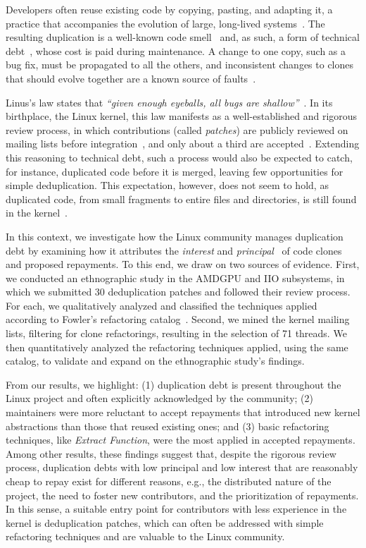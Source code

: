 \documentclass[10pt,conference]{IEEEtran}
\begin{document}
Developers often reuse existing code by copying, pasting, and adapting it, a practice that accompanies the evolution of large, long-lived systems~\cite{kumar2016bigclones}. The resulting duplication is a well-known code smell~\cite{fowler2018refactoring} and, as such, a form of technical debt~\cite{kruchten2012technical}, whose cost is paid during maintenance. A change to one copy, such as a bug fix, must be propagated to all the others, and inconsistent changes to clones that should evolve together are a known source of faults~\cite{juergens2009clones}.

Linus's law states that \textit{``given enough eyeballs, all bugs are shallow''}~\cite{raymond1999cathedral}.
In its birthplace, the Linux kernel, this law manifests as a well-established and rigorous review process, in which contributions (called \textit{patches}) are publicly reviewed on mailing lists before integration~\cite{linux_process_mailinglist}, and only about a third are accepted~\cite{jiang2013patch}.
Extending this reasoning to technical debt, such a process would also be expected to catch, for instance, duplicated code before it is merged, leaving few opportunities for simple deduplication.
This expectation, however, does not seem to hold, as duplicated code, from small fragments to entire files and directories, is still found in the kernel~\cite{kumar2016bigclones}.

In this context, we investigate how the Linux community manages duplication debt by examining how it attributes the \textit{interest} and \textit{principal}~\cite{seaman2011measuring} of code clones and proposed repayments.
To this end, we draw on two sources of evidence.
First, we conducted an ethnographic study in the AMDGPU and IIO subsystems, in which we submitted 30 deduplication patches and followed their review process. For each, we qualitatively analyzed and classified the techniques applied according to Fowler's refactoring catalog~\cite{fowler2018refactoring}. Second, we mined the kernel mailing lists, filtering for clone refactorings, resulting in the selection of 71 threads. We then quantitatively analyzed the refactoring techniques applied, using the same catalog, to validate and expand on the ethnographic study's findings.

From our results, we highlight: (1) duplication debt is present throughout the Linux project and often explicitly acknowledged by the community; (2) maintainers were more reluctant to accept repayments that introduced new kernel abstractions than those that reused existing ones; and (3) basic refactoring techniques, like \textit{Extract Function}, were the most applied in accepted repayments.
Among other results, these findings suggest that, despite the rigorous review process, duplication debts with low principal and low interest that are reasonably cheap to repay exist for different reasons, e.g., the distributed nature of the project, the need to foster new contributors, and the prioritization of repayments. In this sense, a suitable entry point for contributors with less experience in the kernel is deduplication patches, which can often be addressed with simple refactoring techniques and are valuable to the Linux community.
\end{document}
